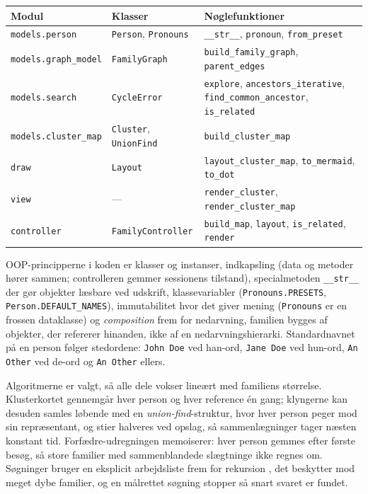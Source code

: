 \documentclass[12pt, a4paper]{article}
\begin{document}
\begin{center}\footnotesize
\begin{tabular}{@{}p{}p{}p{}@{}}
\toprule
\textbf{Modul} & \textbf{Klasser} & \textbf{Nøglefunktioner} \\
\midrule
\texttt{models.person} & \texttt{Person}, \texttt{Pronouns} &
  \texttt{\_\_str\_\_}, \texttt{pronoun}, \texttt{from\_preset} \\
\texttt{models.graph\_model} & \texttt{FamilyGraph} &
  \texttt{build\_family\_graph}, \texttt{parent\_edges} \\
\texttt{models.search} & \texttt{CycleError} &
  \texttt{explore}, \texttt{ancestors\_iterative},
  \texttt{find\_common\_ancestor}, \texttt{is\_related} \\
\texttt{models.cluster\_map} & \texttt{Cluster}, \texttt{UnionFind} &
  \texttt{build\_cluster\_map} \\
\texttt{draw} & \texttt{Layout} &
  \texttt{layout\_cluster\_map}, \texttt{to\_mermaid}, \texttt{to\_dot} \\
\texttt{view} & --- &
  \texttt{render\_cluster}, \texttt{render\_cluster\_map} \\
\texttt{controller} & \texttt{FamilyController} &
  \texttt{build\_map}, \texttt{layout}, \texttt{is\_related}, \texttt{render} \\
\bottomrule
\end{tabular}
\end{center}

OOP-principperne i koden er klasser og instanser, indkapsling (data og metoder
hører sammen; controlleren gemmer sessionens tilstand), specialmetoden
\texttt{\_\_str\_\_} der gør objekter læsbare ved udskrift, klassevariabler
(\texttt{Pronouns.PRESETS}, \texttt{Person.DEFAULT\_NAMES}), immutabilitet
hvor det giver mening (\texttt{Pronouns} er en frossen dataklasse) og
\emph{composition} frem for nedarvning, familien bygges af objekter, der
refererer hinanden, ikke af en nedarvningshierarki. Standardnavnet på en
person følger stedordene: \texttt{John Doe} ved han-ord, \texttt{Jane Doe} ved
hun-ord, \texttt{An Other} ved de-ord og \texttt{An Other} ellers.

Algoritmerne er valgt, så alle dele vokser lineært med familiens størrelse.
Klusterkortet gennemgår hver person og hver reference én gang; klyngerne kan
desuden samles løbende med en \emph{union-find}-struktur, hvor hver person
peger mod sin repræsentant, og stier halveres ved opslag, så sammenlægninger
tager næsten konstant tid. Forfædre-udregningen memoiserer: hver person
gemmes efter første besøg, så store familier med sammenblandede slægtninge
ikke regnes om. Søgninger bruger en eksplicit arbejdsliste frem for rekursion
, det beskytter mod meget dybe familier, og en målrettet søgning stopper
så snart svaret er fundet.
\end{document}

